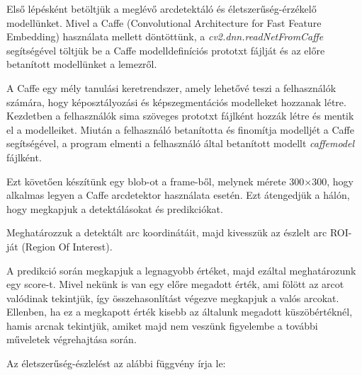 Első lépésként betöltjük a meglévő arcdetektáló és életszerűség-érzékelő modellünket.
Mivel a Caffe (Convolutional Architecture for Fast Feature Embedding) használata mellett döntöttünk, a \textit{cv2.dnn.readNetFromCaffe} segítségével töltjük be a Caffe modelldefiníciós prototxt fájlját és az előre betanított modellünket a lemezről.

A Caffe egy mély tanulási keretrendszer, amely lehetővé teszi a felhasználók számára, hogy képosztályozási és képszegmentációs modelleket hozzanak létre. Kezdetben a felhasználók sima szöveges prototxt fájlként hozzák létre és mentik el a modelleiket. Miután a felhasználó betanította és finomítja modelljét a Caffe segítségével, a program elmenti a felhasználó által betanított modellt \textit{caffemodel} fájlként.

Ezt követően készítünk egy blob-ot a frame-ből, melynek mérete 300×300, hogy alkalmas legyen a Caffe arcdetektor használata esetén. Ezt átengedjük a hálón, hogy megkapjuk a detektálásokat és predikciókat.

Meghatározzuk a detektált arc koordinátáit, majd kivesszük az észlelt arc ROI-ját (Region Of Interest).

A predikció során megkapjuk a legnagyobb értéket, majd ezáltal meghatározunk egy score-t. Mivel nekünk is van egy előre megadott érték, ami fölött az arcot valódinak tekintjük, így összehasonlítást végezve megkapjuk a valós arcokat. Ellenben, ha ez a megkapott érték kisebb az általunk megadott küszöbértéknél, hamis arcnak tekintjük, amiket majd nem veszünk figyelembe a további műveletek végrehajtása során.

\newpage

Az életszerűség-észlelést az alábbi függvény írja le:

